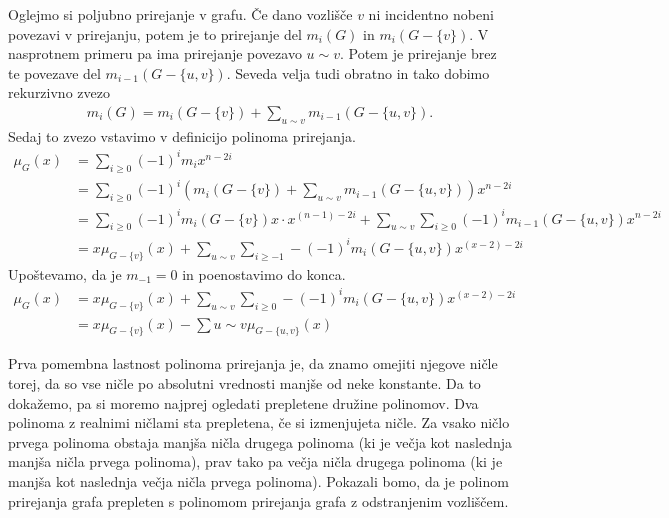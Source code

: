 \begin{dokaz}
    Oglejmo si poljubno prirejanje v grafu. Če dano vozlišče \(v\) ni incidentno nobeni povezavi v prirejanju, potem je to prirejanje del \(m_i(G)\) in \(m_i({G-\{v\}})\). V nasprotnem primeru pa ima prirejanje povezavo \(u\sim v\). Potem je prirejanje brez te povezave del \(m_{i-1}({G-\{u, v\}})\). Seveda velja tudi obratno in tako dobimo rekurzivno zvezo
    \begin{align*}
        m_i(G) = m_i({G-\{v\}}) + \sum_{u\sim v} m_{i-1}({G-\{u, v\}}).
    \end{align*}
    Sedaj to zvezo vstavimo v definicijo polinoma prirejanja.
    \begin{align*}
        \mu_G(x) & = \sum_{i\geq 0} (-1)^i m_i x^{n-2i}                                                                                             \\
                 & = \sum_{i\geq 0} (-1)^i \left( m_i({G-\{v\}}) + \sum_{u\sim v} m_{i-1}({G-\{u, v\}}) \right) x^{n-2i}                            \\
                 & = \sum_{i\geq 0} (-1)^i m_i({G-\{v\}}) x\cdot x^{(n-1)-2i} + \sum_{u\sim v} \sum_{i\geq 0} (-1)^i m_{i-1}({G-\{u, v\}}) x^{n-2i} \\
                 & = x \mu_{G-\{v\}}(x) + \sum_{u\sim v} \sum_{i \geq -1} -(-1)^i m_{i}(G-\{u, v\}) x^{(x-2)-2i}
    \end{align*}
    Upoštevamo, da je \(m_{-1} = 0\) in poenostavimo do konca.
    \begin{align*}
        \mu_G(x) & = x \mu_{G-\{v\}}(x) + \sum_{u\sim v} \sum_{i \geq 0} -(-1)^i m_{i}(G-\{u, v\}) x^{(x-2)-2i} \\
                 & = x \mu_{G-\{v\}}(x) - \sum{u\sim v} \mu_{G-\{u, v\}}(x)
    \end{align*}
\end{dokaz}

Prva pomembna lastnost polinoma prirejanja je, da znamo omejiti njegove ničle torej, da so vse ničle po absolutni vrednosti manjše od neke konstante. Da to dokažemo, pa si moremo najprej ogledati prepletene družine polinomov. Dva polinoma z realnimi ničlami sta prepletena, če si izmenjujeta ničle. Za vsako ničlo prvega polinoma obstaja manjša ničla drugega polinoma (ki je večja kot naslednja manjša ničla prvega polinoma), prav tako pa večja ničla drugega polinoma (ki je manjša kot naslednja večja ničla prvega polinoma). Pokazali bomo, da je polinom prirejanja grafa prepleten s polinomom prirejanja grafa z odstranjenim vozliščem.


